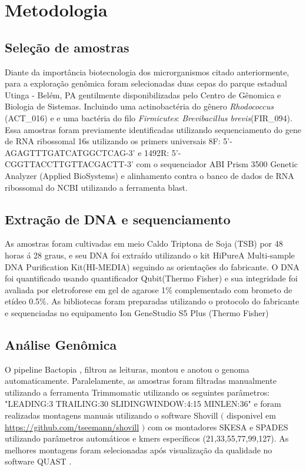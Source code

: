 \chapter{Metodologia}
\section{Seleção de amostras}

Diante da importância biotecnologia dos microrganismos citado anteriormente, 
para a exploração genômica foram selecionadas duas cepas do parque estadual Utinga - Belém, PA gentilmente disponibilizadas pelo Centro de Gênomica e Biologia de Sistemas.
Incluindo uma actinobactéria do gênero \textit{Rhodococcus} (ACT\_016) e e uma bactéria do filo \textit{Firmicutes}: \textit{Brevibacillus brevis}(FIR\_094).
Essa amostras foram previamente identificadas utilizando sequenciamento do gene de RNA ribossomal 16s
utilizando os primers universais 8F: 5'-AGAGTTTGATCATGGCTCAG-3' e 1492R: 5'-CGGTTACCTTGTTACGACTT-3' com o sequenciador 
ABI Prism 3500 Genetic Analyzer (Applied BioSystems) e alinhamento contra o banco de dados de RNA ribossomal do NCBI utilizando a ferramenta
blast.

\section{Extração de DNA e sequenciamento}
As amostras foram cultivadas em meio Caldo Triptona de Soja (TSB) por 48 horas á 28 graus, e
seu DNA foi extraído utilizando o kit HiPureA Multi-sample DNA Purification Kit(HI-MEDIA) seguindo as orientações
do fabricante. O DNA foi quantificado usando quantificador Qubit(Thermo Fisher) e sua integridade foi 
avaliada por eletroforese em gel de agarose 1\% complementado com brometo de etídeo 0.5\%.
As bibliotecas foram preparadas utilizando o protocolo do fabricante e sequenciadas no equipamento
Ion GeneStudio S5 Plus (Thermo Fisher)

\section{Análise Genômica}
O pipeline Bactopia \cite{Bactopia}, filtrou as leituras, montou e anotou o genoma automaticamente.
Paralelamente, as amostras foram filtradas manualmente utilizando a ferramenta Trimmomatic \cite{bolger2014trimmomatic}
utilizando os seguintes parâmetros: "LEADING:3 TRAILING:30 SLIDINGWINDOW:4:15 MINLEN:36"
e foram realizadas montagens manuais utilizando o software Shovill $($ disponivel em \url{https://github.com/tseemann/shovill} $)$ com os 
montadores SKESA \cite{souvorov2018skesa} e SPADES \cite{bankevich2012spades} utilizando
parâmetros automáticos e kmers específicos (21,33,55,77,99,127).
As melhores montagens foram selecionadas após visualização da qualidade no software QUAST \cite{gurevich2013quast}. 

